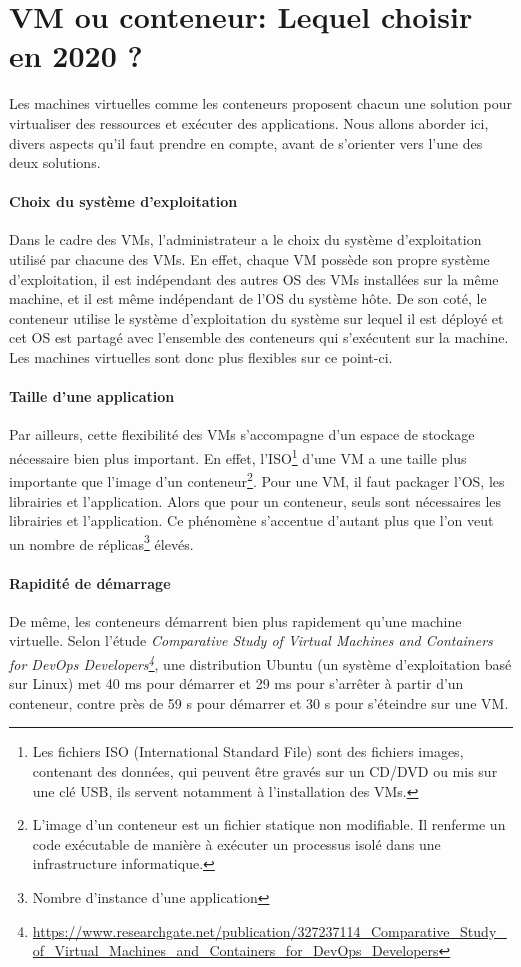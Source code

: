 \documentclass[11pt,fleqn]{book} %
\begin{document}
\section{VM ou conteneur: Lequel choisir en 2020 ? }
Les machines virtuelles comme les conteneurs proposent chacun une solution pour virtualiser des ressources et exécuter des applications. Nous allons aborder ici, divers aspects qu'il faut prendre en compte, avant de s'orienter vers l'une des deux solutions.

\paragraph{Choix du système d'exploitation}
Dans le cadre des VMs, l'administrateur a le choix du système d'exploitation utilisé par chacune des VMs. En effet, chaque VM possède son propre système d'exploitation, il est indépendant des autres OS des VMs installées sur la même machine, et il est même indépendant de l'OS du système hôte. De son coté, le conteneur utilise le système d'exploitation du système sur lequel il est déployé et cet OS est partagé avec l'ensemble des conteneurs qui s'exécutent sur la machine. Les machines virtuelles sont donc plus flexibles sur ce point-ci.

\paragraph{Taille d'une application}
Par ailleurs, cette flexibilité des VMs s'accompagne d'un espace de stockage nécessaire bien plus important. En effet, l'ISO\footnote{Les fichiers ISO (International Standard File) sont des fichiers images, contenant des données, qui peuvent être gravés sur un CD/DVD ou mis sur une clé USB, ils servent notamment à l'installation des VMs.} d'une VM a une taille plus importante que l'image d'un conteneur\footnote{L'image d'un conteneur est un fichier statique non modifiable. Il renferme un code exécutable de manière à exécuter un processus isolé dans une infrastructure informatique.}. Pour une VM, il faut packager l'OS, les librairies et l'application. Alors que pour un conteneur, seuls sont nécessaires les librairies et l'application. Ce phénomène s'accentue d'autant plus que l'on veut un nombre de réplicas\footnote{Nombre d'instance d'une application} élevés.

\paragraph{Rapidité de démarrage}
De même, les conteneurs démarrent bien plus rapidement qu'une machine virtuelle.
Selon l'étude \textit{Comparative Study of Virtual Machines and Containers for DevOps Developers\footnote{\url{https://www.researchgate.net/publication/327237114_Comparative_Study_of_Virtual_Machines_and_Containers_for_DevOps_Developers}}}, une distribution Ubuntu (un système d'exploitation basé sur Linux) met 40 ms pour démarrer et 29 ms pour s'arrêter à partir d'un conteneur, contre près de 59 s pour démarrer et 30 s pour s'éteindre sur une VM.
\end{document}
